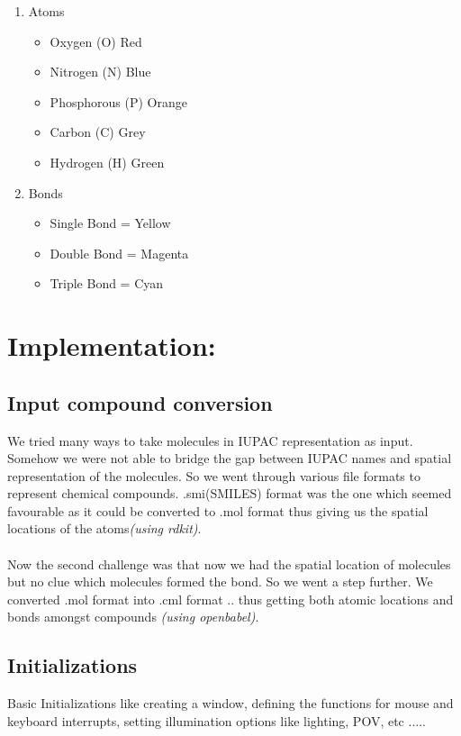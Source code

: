 \documentclass{report}
\begin{document}
\begin{enumerate}
  \item Atoms
  \begin{itemize}
  	\item	Oxygen		(O)		Red
  	\item	Nitrogen		(N)		Blue
  	\item	Phosphorous	(P)		Orange
  	\item	Carbon		(C)		Grey
  	\item	Hydrogen 	(H)		Green
  \end{itemize}
  \item Bonds 
  \begin{itemize}
  	\item	Single Bond 	= Yellow
  	\item	Double Bond 	= Magenta 
  	\item	Triple Bond = Cyan
  \end{itemize}
\end{enumerate}

\section*{Implementation:}
\subsection*{Input compound conversion}
We tried many ways to take molecules in IUPAC representation as input. Somehow we were not able to bridge the gap between IUPAC names and spatial representation of the molecules.
So we went through various file formats to represent chemical compounds. .smi(SMILES) format was the one which seemed favourable as it could be converted to .mol format thus giving us the spatial locations of the atoms\textit{(using rdkit)}.\\
\\
Now the second challenge was that now we had the spatial location of molecules but no clue which molecules formed the bond. So we went a step further. We converted .mol format into .cml format .. thus getting both atomic locations and bonds amongst compounds \textit{(using openbabel)}.

\subsection*{Initializations}
Basic Initializations like creating a window, defining the functions for mouse and keyboard interrupts, setting illumination options like lighting, POV, etc ..... 
\end{document}

